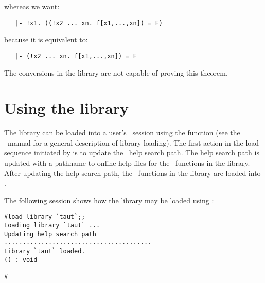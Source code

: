 \noindent
whereas we want:

\begin{boxed}\begin{verbatim}
   |- !x1. ((!x2 ... xn. f[x1,...,xn]) = F)
\end{verbatim}\end{boxed}

\noindent
because it is equivalent to:

\begin{boxed}\begin{verbatim}
   |- (!x2 ... xn. f[x1,...,xn]) = F
\end{verbatim}\end{boxed}

\noindent
The conversions in the  library are not capable of proving this
theorem.


\section{Using the library}

The  library can be loaded into a user's \HOL\ session using the
function  (see the
\HOL\ manual for a general description of library loading). The first action
in the load sequence initiated by  is to update the \HOL\
help search path. The help search path is
updated with a pathname to online help files for the \ML\ functions in the
library. After updating the help search path, the \ML\ functions in the
library are loaded into \HOL.

The following session shows how the  library may be loaded using
\ml{load\_library}:

\setcounter{sessioncount}{1}
\begin{session}\begin{verbatim}
#load_library `taut`;;
Loading library `taut` ...
Updating help search path
........................................
Library `taut` loaded.
() : void

#
\end{verbatim}\end{session}

